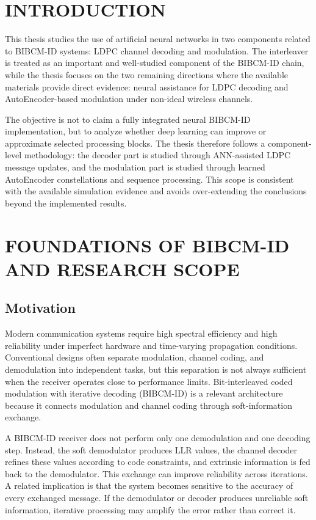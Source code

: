 ﻿\chapter*{INTRODUCTION}
This thesis studies the use of artificial neural networks in two components related to BIBCM-ID systems: LDPC channel decoding and modulation. The interleaver is treated as an important and well-studied component of the BIBCM-ID chain, while the thesis focuses on the two remaining directions where the available materials provide direct evidence: neural assistance for LDPC decoding and AutoEncoder-based modulation under non-ideal wireless channels.

The objective is not to claim a fully integrated neural BIBCM-ID implementation, but to analyze whether deep learning can improve or approximate selected processing blocks. The thesis therefore follows a component-level methodology: the decoder part is studied through ANN-assisted LDPC message updates, and the modulation part is studied through learned AutoEncoder constellations and sequence processing. This scope is consistent with the available simulation evidence and avoids over-extending the conclusions beyond the implemented results.

\chapter[\textbf{FOUNDATIONS OF BIBCM-ID AND RESEARCH SCOPE}]{FOUNDATIONS OF BIBCM-ID AND RESEARCH SCOPE}
\section{Motivation}
Modern communication systems require high spectral efficiency and high reliability under imperfect hardware and time-varying propagation conditions. Conventional designs often separate modulation, channel coding, and demodulation into independent tasks, but this separation is not always sufficient when the receiver operates close to performance limits. Bit-interleaved coded modulation with iterative decoding (BIBCM-ID) is a relevant architecture because it connects modulation and channel coding through soft-information exchange.

A BIBCM-ID receiver does not perform only one demodulation and one decoding step. Instead, the soft demodulator produces LLR values, the channel decoder refines these values according to code constraints, and extrinsic information is fed back to the demodulator. This exchange can improve reliability across iterations. A related implication is that the system becomes sensitive to the accuracy of every exchanged message. If the demodulator or decoder produces unreliable soft information, iterative processing may amplify the error rather than correct it.

